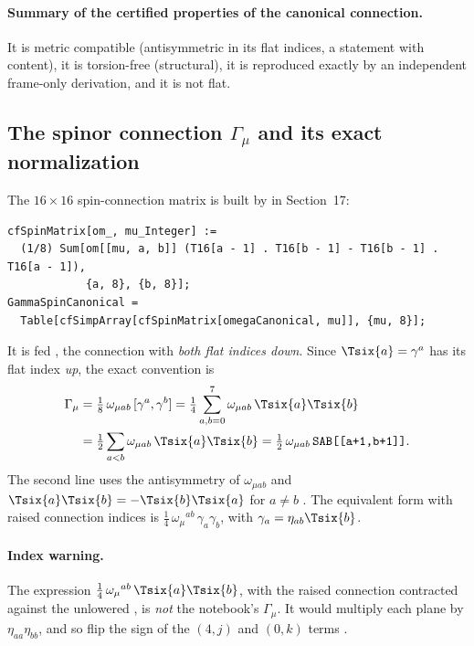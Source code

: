 \paragraph{Summary of the certified properties of the canonical connection.} It is metric
compatible (antisymmetric in its flat indices, a statement with content), it is torsion-free
(structural), it is reproduced exactly by an independent frame-only derivation, and it is not
flat.

\subsection{The spinor connection \texorpdfstring{$\Gamma_\mu$}{Gamma-mu} and its exact normalization}
\label{csc:spinmatrix}\label{sec:6.7}

The $16\times16$ spin-connection matrix is built by  in Section~17:

{\scriptsize
\begin{verbatim}
cfSpinMatrix[om_, mu_Integer] :=
  (1/8) Sum[om[[mu, a, b]] (T16[a - 1] . T16[b - 1] - T16[b - 1] . T16[a - 1]),
            {a, 8}, {b, 8}];
GammaSpinCanonical =
  Table[cfSimpArray[cfSpinMatrix[omegaCanonical, mu]], {mu, 8}];
\end{verbatim}
}

It is fed , the connection with \emph{both flat indices down}. Since
$\Tsix{a}=\gamma^a$ has its flat index \emph{up}, the exact convention is
\begin{equation}
\begin{aligned}
  \Gamma_\mu&=\tfrac18\,\omega_{\mu ab}\,[\gamma^a,\gamma^b]
   =\tfrac14\sum_{a,b=0}^{7}\omega_{\mu ab}\,\Tsix{a}\Tsix{b}\\
  &=\tfrac12\sum_{a<b}\omega_{\mu ab}\,\Tsix{a}\Tsix{b}
   =\tfrac12\,\omega_{\mu ab}\,\texttt{SAB[[a+1,b+1]]} .
\end{aligned}
\end{equation}
The second line uses the antisymmetry of $\omega_{\mu ab}$ and $\Tsix{a}\Tsix{b}=-\Tsix{b}\Tsix{a}$
for $a\neq b$ \cfderived. The equivalent form with raised connection indices is
$\tfrac14\,\omega_\mu{}^{ab}\,\gamma_a\gamma_b$, with $\gamma_a=\eta_{ab}\Tsix{b}$.

\paragraph{Index warning.} The expression $\tfrac14\,\omega_\mu{}^{ab}\,\Tsix{a}\Tsix{b}$, with the
raised connection contracted against the unlowered , is \emph{not} the notebook's
$\Gamma_\mu$. It would multiply each plane by $\eta_{aa}\eta_{bb}$, and so flip the sign of the
$(4,j)$ and $(0,k)$ terms \cfderived.

